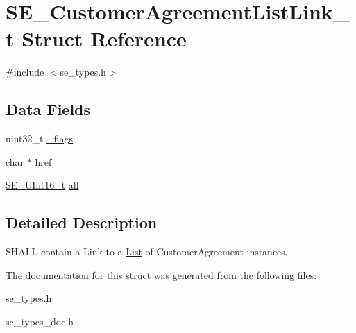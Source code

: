 \hypertarget{structSE__CustomerAgreementListLink__t}{}\section{S\+E\+\_\+\+Customer\+Agreement\+List\+Link\+\_\+t Struct Reference}
\label{structSE__CustomerAgreementListLink__t}


{\ttfamily \#include $<$se\+\_\+types.\+h$>$}

\subsection*{Data Fields}
\begin{DoxyCompactItemize}
\item 
uint32\+\_\+t \hyperlink{group__CustomerAgreementListLink_ga617af80e74d41067f1798ec6ff0996d0}{\+\_\+flags}
\item 
char $\ast$ \hyperlink{group__CustomerAgreementListLink_gacc3612285c41b988cc39cd0bb29e7300}{href}
\item 
\hyperlink{group__UInt16_gac68d541f189538bfd30cfaa712d20d29}{S\+E\+\_\+\+U\+Int16\+\_\+t} \hyperlink{group__CustomerAgreementListLink_gad78e3e9fc208189a5e63162847120fc7}{all}
\end{DoxyCompactItemize}


\subsection{Detailed Description}
S\+H\+A\+LL contain a Link to a \hyperlink{structList}{List} of Customer\+Agreement instances. 

The documentation for this struct was generated from the following files\+:\begin{DoxyCompactItemize}
\item 
se\+\_\+types.\+h\item 
se\+\_\+types\+\_\+doc.\+h\end{DoxyCompactItemize}
